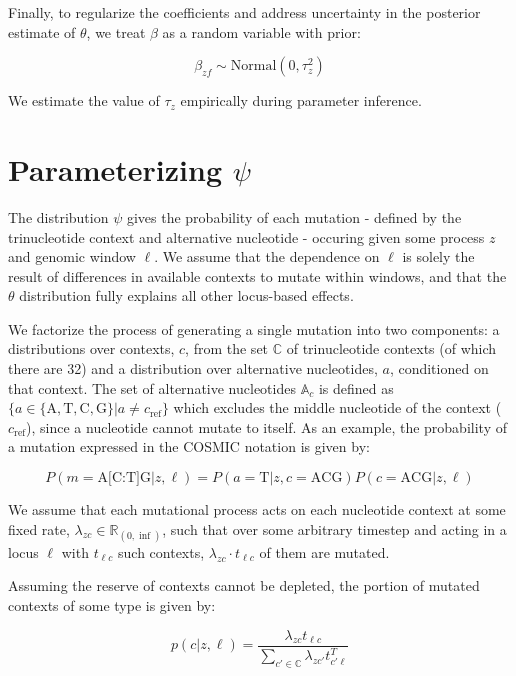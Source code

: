 \documentclass{article}
\begin{document}
Finally, to regularize the coefficients and address uncertainty in the posterior estimate of $\theta$, we treat $\beta$ as a random variable with prior:

\begin{equation}
\beta_{zf} \sim \textrm{Normal}(0,\tau^2_z)
\end{equation}

We estimate the value of $\tau_z$ empirically during parameter inference.

\section{Parameterizing $\psi$}

The distribution $\psi$ gives the probability of each mutation - defined by the trinucleotide context and alternative nucleotide - occuring given some process $z$ and genomic window $\ell$. We assume that the dependence on $\ell$ is solely the result of differences in available contexts to mutate within windows, and that the $\theta$ distribution fully explains all other locus-based effects.

We factorize the process of generating a single mutation into two components: a distributions over contexts, $c$, from the set $\mathbb{C}$ of trinucleotide contexts (of which there are 32) and a distribution over alternative nucleotides, $a$, conditioned on that context. The set of alternative nucleotides $\mathbb{A}_c$ is defined as $\{ a \in \{\mathrm{A, T, C, G}\} | a \neq c_{\mathrm{ref}}\}$ which excludes the middle nucleotide of the context ($c_{\mathrm{ref}}$), since a nucleotide cannot mutate to itself. As an example, the probability of a mutation expressed in the COSMIC notation is given by:

\begin{equation}
P(m = \textrm{A[C:T]G} | z, \ell) = P(a=\textrm{T} | z, c=\textrm{ACG}) P(c=\textrm{ACG} | z, \ell)
\end{equation}

We assume that each mutational process acts on each nucleotide context at some fixed rate, $\lambda_{zc} \in \mathbb{R}_{(0,\inf)}$, such that over some arbitrary timestep and acting in a locus $\ell$ with $ t_{\ell c}$ such contexts, $\lambda_{zc}\cdot t_{\ell c}$ of them are mutated.

Assuming the reserve of contexts cannot be depleted, the portion of mutated contexts of some type is given by:

\begin{equation}
p(c | z, \ell) = \frac{\lambda_{zc}t_{\ell c}}{\sum_{c'\in \mathbb{C}} \lambda_{zc'}t^{T}_{c' \ell}} 
\end{equation}
 
\end{document}
